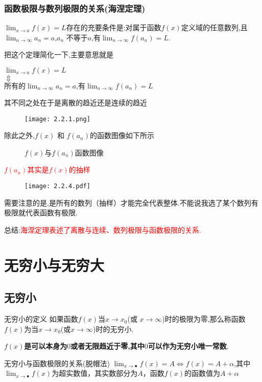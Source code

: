 \documentclass[12pt, a4paper, oneside, UTF8]{ctexbook}  %
\begin{document}
\begin{sloppypar}
    \subsubsection{函数极限与数列极限的关系(海涅定理)}
    \begin{them}{}{}
        $\lim_{x \to a}f(x)=L$存在的充要条件是:对属于函数$f(x)$定义域的任意数列,且$\lim_{n\to\infty}a_n=a$,$a_n$ 不等于$a$,有$\lim_{n\to\infty}f(a_n)=L$.
    \end{them}
    把这个定理简化一下,主要意思就是
    \begin{center}
        $\lim_{x\to a}f(x)=L$\\
        $\Updownarrow $ \\
        $\text{所有的}\lim_{n\to\infty}a_n=a\text{,有}\lim_{n\to\infty}f(a_n)=L$
    \end{center}
    其不同之处在于是离散的趋近还是连续的趋近
    \begin{figure}[H]
        \centering \texttt{[image: 2.2.1.png]}
    \end{figure}
    除此之外,$f(x)$ 和 $f(a_n)$的函数图像如下所示
    \begin{figure}[H] \centering
        \caption{$f(x)$与$f(a_n)$函数图像}
    \end{figure}

    \textcolor{red}{$f(a_n)$其实是$f(x)$的抽样}
    \begin{figure}[H]
        \centering \texttt{[image: 2.2.4.pdf]}
    \end{figure}
    需要注意的是,是所有的数列（抽样）才能完全代表整体.不能说我选了某个数列有极限就代表函数有极限.

    总结:\textcolor{red}{海涅定理表述了离散与连续、数列极限与函数极限的关系.}
    \section{无穷小与无穷大}
    \subsection{无穷小}
    \begin{defn}{无穷小的定义}{}
        如果函数$f(x)$当$x\to x_0$(或 $x\to\infty$)时的极限为零,那么称函数$f(x)$为当$x\to x_0$(或$x\to\infty$)时的无穷小.
    \end{defn}
    \textbf{$f(x)$是可以本身为$0$或者无限趋近于零,其中$0$可以作为无穷小唯一常数}.
    \begin{criterion}{无穷小与函数极限的关系(脱帽法)}{}
        $\lim_{x\to\bullet}f(x)=A\Leftrightarrow f(x)=A+\alpha$,其中$\lim_{x\to\bullet}f(x)$为超实数值，其实数部分为$A$，函数$f(x)$的函数值为$A+\alpha$
    \end{criterion}

\end{sloppypar}
\end{document}
